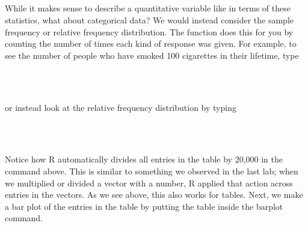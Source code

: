 \documentclass[11pt]{article}
\begin{document}
\ttfamily\noindent
\hlstd{}\hspace*{\fill}\\
\hlstd{}\hlkeyword{(}\hlkeyword{\usebox{\hlnormalsizeboxdollar}}\hlkeyword{)}\hspace*{\fill}\\
\hlstd{}\hlkeyword{(}\hlkeyword{\usebox{\hlnormalsizeboxdollar}}\hlkeyword{)}\hspace*{\fill}\\
\hlstd{}\hlkeyword{(}\hlkeyword{\usebox{\hlnormalsizeboxdollar}}\hlkeyword{)}\hspace*{\fill}\\
\normalfont

While it makes sense to describe a quantitative variable like \texttt{} in terms of these statistics, what about categorical data?  We would instead consider the sample frequency or relative frequency distribution.  The function \texttt{} does this for you by counting the number of times each kind of response was given. For example, to see the number of people who have smoked 100 cigarettes in their lifetime, type

\ttfamily\noindent
\hlstd{}\hspace*{\fill}\\
\hlstd{}\hlkeyword{(}\hlkeyword{\usebox{\hlnormalsizeboxdollar}}\hlkeyword{)}\hspace*{\fill}\\
\normalfont

or instead look at the relative frequency distribution by typing

\ttfamily\noindent
\hlstd{}\hspace*{\fill}\\
\hlstd{}\hlkeyword{(}\hlkeyword{\usebox{\hlnormalsizeboxdollar}}\hlkeyword{)}\hlkeyword{/}\hspace*{\fill}\\
\normalfont

Notice how R automatically divides all entries in the table by 20,000 in the command above. This is similar to something we observed in the last lab; when we multiplied or divided a vector with a number, R applied that action across entries in the vectors. As we see above, this also works for tables. Next, we make a bar plot of the entries in the table by putting the table inside the barplot command.
\end{document}
